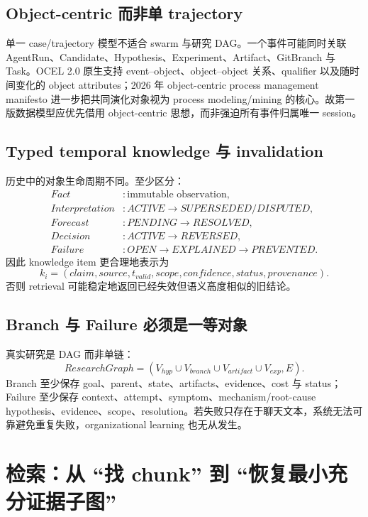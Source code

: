 \documentclass[11pt,a4paper]{ctexart}
\begin{document}
\subsection{Object-centric 而非单 trajectory}
单一 case/trajectory 模型不适合 swarm 与研究 DAG。一个事件可能同时关联 AgentRun、Candidate、Hypothesis、Experiment、Artifact、GitBranch 与 Task。OCEL 2.0 原生支持 event--object、object--object 关系、qualifier 以及随时间变化的 object attributes\cite{berti2024ocel}；2026 年 object-centric process management manifesto 进一步把共同演化对象视为 process modeling/mining 的核心\cite{seidel2026ocpm}。故第一版数据模型应优先借用 object-centric 思想，而非强迫所有事件归属唯一 session。

\subsection{Typed temporal knowledge 与 invalidation}
历史中的对象生命周期不同。至少区分：
\begin{align}
Fact &: \text{immutable observation},\\
Interpretation &: ACTIVE\to SUPERSEDED/DISPUTED,\\
Forecast &: PENDING\to RESOLVED,\\
Decision &: ACTIVE\to REVERSED,\\
Failure &: OPEN\to EXPLAINED\to PREVENTED.
\end{align}
因此 knowledge item 更合理地表示为
\begin{equation}
k_i=(claim,source,t_{valid},scope,confidence,status,provenance).
\end{equation}
否则 retrieval 可能稳定地返回已经失效但语义高度相似的旧结论。

\subsection{Branch 与 Failure 必须是一等对象}
真实研究是 DAG 而非单链：
\begin{equation}
ResearchGraph=(V_{hyp}\cup V_{branch}\cup V_{artifact}\cup V_{exp},E).
\end{equation}
Branch 至少保存 goal、parent、state、artifacts、evidence、cost 与 status；Failure 至少保存 context、attempt、symptom、mechanism/root-cause hypothesis、evidence、scope、resolution。若失败只存在于聊天文本，系统无法可靠避免重复失败，organizational learning 也无从发生。

\section{检索：从 ``找 chunk'' 到 ``恢复最小充分证据子图''}
\end{document}
